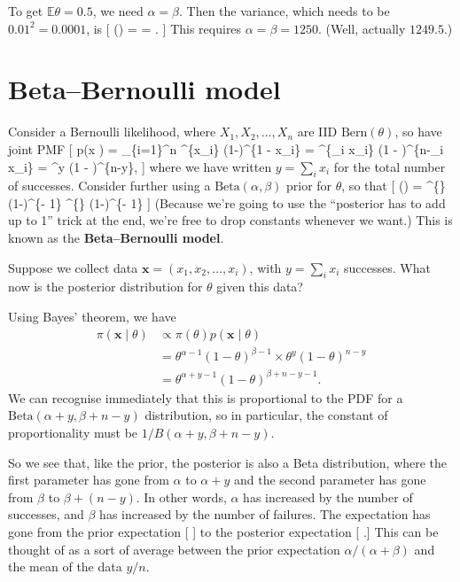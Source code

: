 \documentclass[
  letterpaper,
]{report}
\theoremstyle{definition}
\theoremstyle{definition}
\theoremstyle{remark}
\begin{document}
To get \(\mathbb E\theta = 0.5\), we need \(\alpha = \beta\). Then the
variance, which needs to be \(0.01^2 = 0.0001\), is {[} \Var(\theta) =
 =  .
{]} This requires \(\alpha = \beta = 1250\). (Well, actually
\(1249.5\).)

\hypertarget{beta-bern}{%
\section{Beta--Bernoulli model}\label{beta-bern}}

Consider a Bernoulli likelihood, where \(X_1, X_2, \dots, X_n\) are IID
\(\text{Bern}(\theta)\), so have joint PMF {[} p(\mathbf x \mid \theta)
= \prod\_\{i=1\}\^{}n \theta\^{}\{x\_i\} (1-\theta)\^{}\{1 - x\_i\} =
\theta\^{}\{\sum\_i x\_i\} (1 - \theta)\^{}\{n-\sum\_i x\_i\} =
\theta\^{}y (1 - \theta)\^{}\{n-y\}, {]} where we have written
\(y = \sum_i x_i\) for the total number of successes. Consider further
using a \(\text{Beta}(\alpha, \beta)\) prior for \(\theta\), so that {[}
\pi(\theta) =  \theta\^{}\{\}
(1-\theta)\^{}\{\beta - 1\} \propto \theta\^{}\{\}
(1-\theta)\^{}\{\beta - 1\} {]} (Because we're going to use the
``posterior has to add up to 1'' trick at the end, we're free to drop
constants whenever we want.) This is known as the
\textbf{Beta--Bernoulli model}.

Suppose we collect data \(\mathbf x = (x_1, x_2, \dots, x_i)\), with
\(y = \sum_i x_i\) successes. What now is the posterior distribution for
\(\theta\) given this data?

Using Bayes' theorem, we have \begin{align*}
\pi(\mathbf x \mid \theta)
  &\propto \pi(\theta) p(\mathbf x \mid \theta) \\
  &= \theta^{\alpha-1} (1-\theta)^{\beta - 1} \times \theta^y (1 - \theta)^{n-y} \\
  &= \theta^{\alpha + y - 1} (1 - \theta)^{\beta + n - y - 1} .
\end{align*} We can recognise immediately that this is proportional to
the PDF for a \(\text{Beta}(\alpha + y, \beta + n - y)\) distribution,
so in particular, the constant of proportionality must be
\(1/B(\alpha + y, \beta + n - y)\).

So we see that, like the prior, the posterior is also a Beta
distribution, where the first parameter has gone from \(\alpha\) to
\(\alpha + y\) and the second parameter has gone from \(\beta\) to
\(\beta + (n-y)\). In other words, \(\alpha\) has increased by the
number of successes, and \(\beta\) has increased by the number of
failures. The expectation has gone from the prior expectation {[}
\frac{\alpha}{\alpha + \beta} {]} to the posterior expectation {[}
 .{]} This can be thought of as a
sort of average between the prior expectation
\(\alpha/(\alpha + \beta)\) and the mean of the data \(y/n\).
\end{document}
